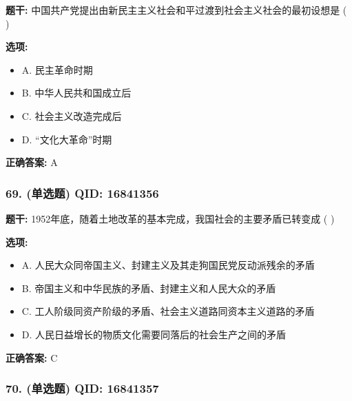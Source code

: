 \documentclass[12pt,UTF8]{ctexart}
\begin{document}
\textbf{题干:}
中国共产党提出由新民主主义社会和平过渡到社会主义社会的最初设想是 ( )

\textbf{选项:}
\begin{itemize}[leftmargin=*]

  \item A. 民主革命时期

  \item B. 中华人民共和国成立后

  \item C. 社会主义改造完成后

  \item D. “文化大革命”时期

\end{itemize}

\textbf{正确答案:}
A

\vspace{0.3em}\hrulefill\vspace{0.7em}

\subsubsection*{69. (单选题) \small QID: 16841356}

\textbf{题干:}
1952年底，随着土地改革的基本完成，我国社会的主要矛盾已转变成 ( )

\textbf{选项:}
\begin{itemize}[leftmargin=*]

  \item A. 人民大众同帝国主义、封建主义及其走狗国民党反动派残余的矛盾

  \item B. 帝国主义和中华民族的矛盾、封建主义和人民大众的矛盾

  \item C. 工人阶级同资产阶级的矛盾、社会主义道路同资本主义道路的矛盾

  \item D. 人民日益增长的物质文化需要同落后的社会生产之间的矛盾

\end{itemize}

\textbf{正确答案:}
C

\vspace{0.3em}\hrulefill\vspace{0.7em}

\subsubsection*{70. (单选题) \small QID: 16841357}
\end{document}
